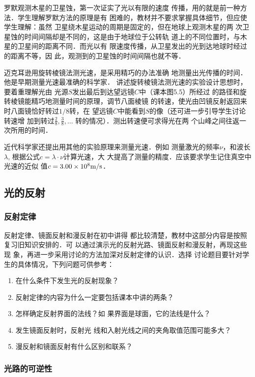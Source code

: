 罗默观测木星的卫星蚀，第一次证实了光以有限的速度
传播，用的就是前一种方法．学生理解罗默方法的原理是有
困难的，教材并不要求掌握具体细节，但应使学生理解：虽然
卫星绕木星运动的周期是固定的，但在地球上观测木星的两
次卫星蚀的时间间隔却是不同的，这是由于地球位于公转轨
道上的不同位置时，与木星的卫星间的距离不同．而光以有
限速度传播，从卫星发出的光到达地球时经过的距离不等，因
此，观测到的卫星蚀的时间间隔也就不等．

迈克耳逊用旋转棱镜法测光速，是采用精巧的办法准确
地测量出光传播的时间．他是早期测量光速最准确的科学家．
讲述旋转棱镜法测光速的实验设计思想时，要着重理解光由
光源$S$发出最后到达望远镜$C$中（课本图5.5）所经过
的路径和旋转棱镜能精巧地测量时间的原理，调节八面棱镜
的转速，使光由凹镜反射返回来时八面镜恰好转过$1/8$转，在
望远镜$C$中能看到$S$的像（还可进一步引导学生讨论转速增
加到转过$\frac{2}{8},\frac{3}{8},\ldots$
转的情况）．测出转速便可求得光在两
个山峰之间往返一次所用的时间．

近代科学家还提出用其他的实验原理来测量光速．例如
测量激光的频率$\nu$，和波长$\lambda$, 根据公式$c=\lambda\cdot \nu$计算光速，大
大提高了测量的精度．应该要求学生记住真空中光速的近似
值$c=3.00\times10^8\text{m}/\text{s}$．

\subsection{光的反射}
\subsubsection{反射定律}

反射定律、镜面反射和漫反射在初中讲得
都比较清楚，教材中这部分内容是按照复习旧知识安排的．可
以通过演示光的反射光路、镜面反射和漫反射，再现这些现
象，再进一步采用讨论的方法加深对反射定律的认识．选择
讨论题目要针对学生的具体情况，下列问题可供参考：
\begin{enumerate}
\item 在什么条件下发生光的反射现象？
\item 反射定律的内容为什么一定要包括课本中讲的两条？
    \item 怎样确定反射界面的法线？如
果界面是球面，它的法线是什么？
    \item 发生镜面反射时，反射光
线和入射光线之间的夹角取值范围可能多大？
    \item 漫反射和镜面反射有什么区别和联系？
\end{enumerate}



\subsubsection{光路的可逆性}

